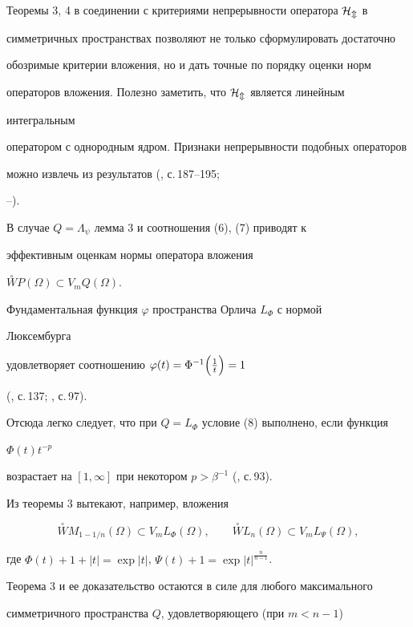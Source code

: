  


Теоремы 3, 4 в соединении с критериями непрерывности оператора $\cal H_m$ в 


симметричных пространствах позволяют не только сформулировать достаточно 


обозримые критерии вложения, но и дать точные по порядку оценки норм 


операторов вложения. Полезно заметить, что $\cal H_m$ является линейным 


интегральным 


оператором с однородным ядром. Признаки непрерывности подобных операторов 


можно извлечь из результатов (\cite{Kre}, с.\,187--195; 


\cite{Kli1}--\cite{Rut}). 


 


В случае $Q=\Lambda_\psi$ лемма 3 и соотношения (6), (7) приводят к 


эффективным оценкам нормы оператора вложения 


$\overset{\circ}{W}P(\Omega)\subset V_mQ(\Omega)$. 


Фундаментальная функция $\varphi$ пространства Орлича $L_\Phi$ с нормой 


Люксембурга 


удовлетворяет соотношению $\varphi(t)=\Phi^{-1}\Bigl(\frac{1}{t}\Bigr)=1$ 


(\cite{Kre}, с.\,137; \cite{Kra}, с.\,97). 


Отсюда легко следует, что при $Q=L_\Phi$ условие (8) выполнено, если функция 


$\Phi(t)t^{-p}$ 


возрастает на $[1,\infty]$ при некотором $p>\beta^{-1}$ (\cite{Bru}, с.\,93). 


Из теоремы 3 вытекают, например, вложения 


$$ 


\overset{\circ}{W}M_{1-1/n}(\Omega)\subset V_mL_\Phi(\Omega), \qquad 


\overset{\circ}{W}L_n(\Omega)\subset V_mL_\Psi(\Omega), 


$$ 


где $\Phi(t)+1+|t|=\exp|t|$, $\Psi(t)+1=\exp|t|^{\frac{n}{n-1}}$. 


 


Теорема 3 и ее доказательство остаются в силе для любого максимального 


симметричного пространства $Q$, удовлетворяющего (при $m<n-1$) 


